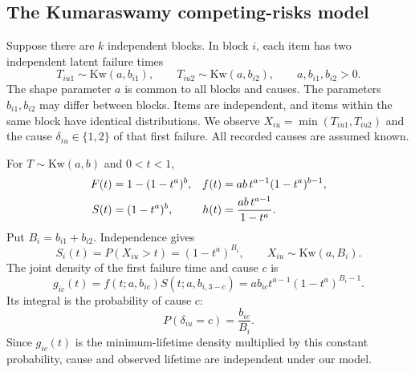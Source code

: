\documentclass[a4paper,11pt]{article}
\begin{document}
\subsection{The Kumaraswamy competing-risks model}
Suppose there are $k$ independent blocks. In block $i$, each item has two independent latent failure times
\begin{equation}\label{eq:latent}
T_{iu1}\sim\mathrm{Kw}(a,b_{i1}),\qquad T_{iu2}\sim\mathrm{Kw}(a,b_{i2}),\qquad a,b_{i1},b_{i2}>0.
\end{equation}
The shape parameter $a$ is common to all blocks and causes. The parameters $b_{i1},b_{i2}$ may differ between blocks. Items are independent, and items within the same block have identical distributions. We observe $X_{iu}=\min(T_{iu1},T_{iu2})$ and the cause $\delta_{iu}\in\{1,2\}$ of that first failure. All recorded causes are assumed known.

For $T\sim\mathrm{Kw}(a,b)$ and $0<t<1$,
\begin{align}\label{eq:kw}
F(t)&=1-(1-t^a)^b,& f(t)&=ab\,t^{a-1}(1-t^a)^{b-1},\\\notag
S(t)&=(1-t^a)^b,& h(t)&=\frac{ab\,t^{a-1}}{1-t^a}.
\end{align}
Put $B_i=b_{i1}+b_{i2}$. Independence gives
\begin{equation}\label{eq:minimum}
S_i(t)=P(X_{iu}>t)=(1-t^a)^{B_i},\qquad X_{iu}\sim\mathrm{Kw}(a,B_i).
\end{equation}
The joint density of the first failure time and cause $c$ is
\begin{equation}\label{eq:subdensity}
g_{ic}(t)=f(t;a,b_{ic})S(t;a,b_{i,3-c})
=ab_{ic}t^{a-1}(1-t^a)^{B_i-1}.
\end{equation}
Its integral is the probability of cause $c$:
\begin{equation}\label{eq:prob}
P(\delta_{iu}=c)=\frac{b_{ic}}{B_i}.
\end{equation}
Since $g_{ic}(t)$ is the minimum-lifetime density multiplied by this constant probability, cause and observed lifetime are independent under our model.
\end{document}
